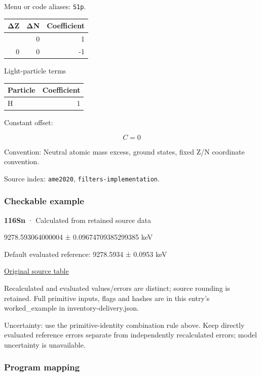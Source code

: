 \documentclass[
  11pt,
  letterpaper,
]{article}
\begin{document}
Menu or code aliases: \texttt{S1p}.

\begin{longtable}[]{@{}rrr@{}}
\toprule\noalign{}
ΔZ & ΔN & Coefficient \\
\midrule\noalign{}
\endhead
\bottomrule\noalign{}
\endlastfoot
-1 & 0 & 1 \\
0 & 0 & -1 \\
\end{longtable}

Light-particle terms

\begin{longtable}[]{@{}lr@{}}
\toprule\noalign{}
Particle & Coefficient \\
\midrule\noalign{}
\endhead
\bottomrule\noalign{}
\endlastfoot
H & 1 \\
\end{longtable}

Constant offset:

\[
C=0
\]

Convention: Neutral atomic mass excess, ground states, fixed Z/N
coordinate convention.

Source index: \texttt{ame2020}, \texttt{filters-implementation}.

\subsubsection{Checkable example}\label{checkable-example-5}

\textbf{116Sn} · Calculated from retained source data

9278.593064000004 ± 0.09674709385299385 keV

Default evaluated reference: 9278.5934 ± 0.0953 keV

\href{https://www-nds.iaea.org/amdc/ame2020/rct2_1.mas20.txt}{Original
source table}

Recalculated and evaluated values/errors are distinct; source rounding
is retained. Full primitive inputs, flags and hashes are in this entry's
worked\_example in inventory-delivery.json.

Uncertainty: use the primitive-identity combination rule above. Keep
directly evaluated reference errors separate from independently
recalculated errors; model uncertainty is unavailable.

\subsubsection{Program mapping}\label{program-mapping-5}
\end{document}
